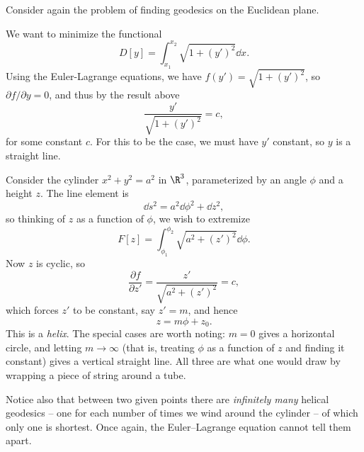 \documentclass[a4paper]{scrartcl}
\begin{document}
\begin{example}
	Consider again the problem of finding geodesics on the Euclidean plane. 

	We want to minimize the functional
	$$
	D[y] = \int_{x_1}^{x_2} \sqrt{1 + (y')^2} \dd x.
	$$
	Using the Euler-Lagrange equations, we have $f(y') = \sqrt{1 + (y')^2}$, so $\partial f/\partial y = 0$, and thus by the result above
	$$
	\frac{y'}{\sqrt{1 + (y')^2}} = c,
	$$
	for some constant $c$. For this to be the case, we must have $y'$ constant, so $y$ is a straight line.
\end{example}

\begin{example}
	Consider the cylinder $x^2 + y^2 = a^2$ in $\R^3$, parameterized by an angle $\phi$ and a height $z$. The line element is
	$$
	\dd s^2 = a^2 \dd\phi^2 + \dd z^2,
	$$
	so thinking of $z$ as a function of $\phi$, we wish to extremize
	$$
	F[z] = \int_{\phi_1}^{\phi_2}\sqrt{a^2 + (z')^2}\dd\phi.
	$$
	Now $z$ is cyclic, so
	$$
	\frac{\partial f}{\partial z'} = \frac{z'}{\sqrt{a^2 + (z')^2}} = c,
	$$
	which forces $z'$ to be constant, say $z' = m$, and hence
	$$
	z = m\phi + z_0.
	$$
	This is a \emph{helix}. The special cases are worth noting: $m = 0$ gives a horizontal circle, and letting $m \to \infty$ (that is, treating $\phi$ as a function of $z$ and finding it constant) gives a vertical straight line. All three are what one would draw by wrapping a piece of string around a tube.

	Notice also that between two given points there are \emph{infinitely many} helical geodesics -- one for each number of times we wind around the cylinder -- of which only one is shortest. Once again, the Euler--Lagrange equation cannot tell them apart.
\end{example}
\end{document}
